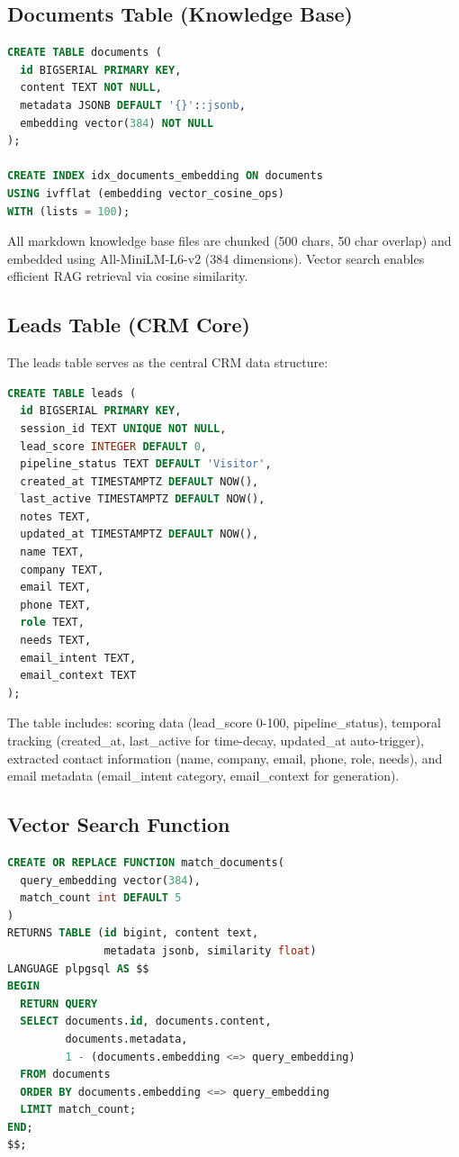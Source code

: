 \documentclass[10pt,twocolumn,a4paper]{article}
\begin{document}
\subsection{Documents Table (Knowledge Base)}

\begin{lstlisting}[language=SQL]
CREATE TABLE documents (
  id BIGSERIAL PRIMARY KEY,
  content TEXT NOT NULL,
  metadata JSONB DEFAULT '{}'::jsonb,
  embedding vector(384) NOT NULL
);

CREATE INDEX idx_documents_embedding ON documents 
USING ivfflat (embedding vector_cosine_ops)
WITH (lists = 100);
\end{lstlisting}

All markdown knowledge base files are chunked (500 chars, 50 char overlap) and embedded using All-MiniLM-L6-v2 (384 dimensions). Vector search enables efficient RAG retrieval via cosine similarity.

\subsection{Leads Table (CRM Core)}

The leads table serves as the central CRM data structure:

\begin{lstlisting}[language=SQL]
CREATE TABLE leads (
  id BIGSERIAL PRIMARY KEY,
  session_id TEXT UNIQUE NOT NULL,
  lead_score INTEGER DEFAULT 0,
  pipeline_status TEXT DEFAULT 'Visitor',
  created_at TIMESTAMPTZ DEFAULT NOW(),
  last_active TIMESTAMPTZ DEFAULT NOW(),
  notes TEXT,
  updated_at TIMESTAMPTZ DEFAULT NOW(),
  name TEXT,
  company TEXT,
  email TEXT,
  phone TEXT,
  role TEXT,
  needs TEXT,
  email_intent TEXT,
  email_context TEXT
);
\end{lstlisting}

The table includes: scoring data (lead\_score 0-100, pipeline\_status), temporal tracking (created\_at, last\_active for time-decay, updated\_at auto-trigger), extracted contact information (name, company, email, phone, role, needs), and email metadata (email\_intent category, email\_context for generation).

\subsection{Vector Search Function}

\begin{lstlisting}[language=SQL]
CREATE OR REPLACE FUNCTION match_documents(
  query_embedding vector(384),
  match_count int DEFAULT 5
)
RETURNS TABLE (id bigint, content text, 
               metadata jsonb, similarity float)
LANGUAGE plpgsql AS $$
BEGIN
  RETURN QUERY
  SELECT documents.id, documents.content,
         documents.metadata,
         1 - (documents.embedding <=> query_embedding)
  FROM documents
  ORDER BY documents.embedding <=> query_embedding
  LIMIT match_count;
END;
$$;
\end{lstlisting}
\end{document}
